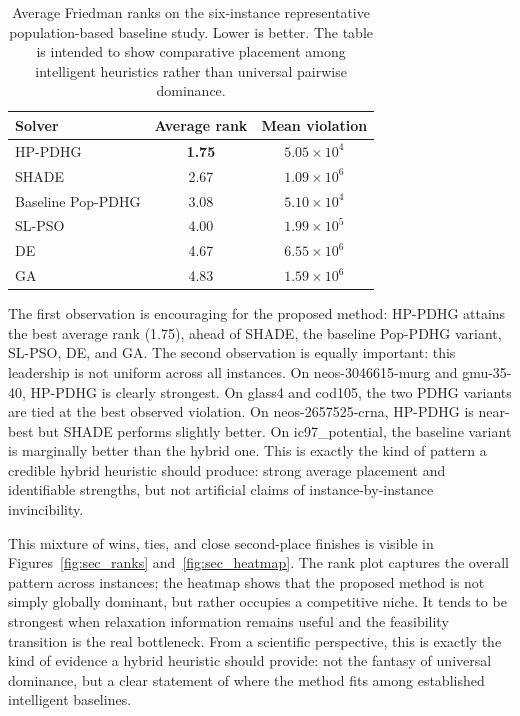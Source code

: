 \begin{table}[htbp]
\centering
\caption{Average Friedman ranks on the six-instance representative population-based baseline study. Lower is better. The table is intended to show comparative placement among intelligent heuristics rather than universal pairwise dominance.}
\label{tab:sec_rank_table}
\small
\begin{tabular}{lcc}
\toprule
\textbf{Solver} & \textbf{Average rank} & \textbf{Mean violation} \\
\midrule
HP-PDHG & \textbf{1.75} & $5.05\times10^{4}$ \\
SHADE & 2.67 & $1.09\times10^{6}$ \\
Baseline Pop-PDHG & 3.08 & $5.10\times10^{4}$ \\
SL-PSO & 4.00 & $1.99\times10^{5}$ \\
DE & 4.67 & $6.55\times10^{6}$ \\
GA & 4.83 & $1.59\times10^{6}$ \\
\bottomrule
\end{tabular}
\end{table}

The first observation is encouraging for the proposed method: HP-PDHG attains the best average rank (1.75), ahead of SHADE, the baseline Pop-PDHG variant, SL-PSO, DE, and GA. The second observation is equally important: this leadership is not uniform across all instances. On neos-3046615-murg and gmu-35-40, HP-PDHG is clearly strongest. On glass4 and cod105, the two PDHG variants are tied at the best observed violation. On neos-2657525-crna, HP-PDHG is near-best but SHADE performs slightly better. On ic97\_potential, the baseline variant is marginally better than the hybrid one. This is exactly the kind of pattern a credible hybrid heuristic should produce: strong average placement and identifiable strengths, but not artificial claims of instance-by-instance invincibility.

This mixture of wins, ties, and close second-place finishes is visible in Figures~\ref{fig:sec_ranks} and~\ref{fig:sec_heatmap}. The rank plot captures the overall pattern across instances; the heatmap shows that the proposed method is not simply globally dominant, but rather occupies a competitive niche. It tends to be strongest when relaxation information remains useful and the feasibility transition is the real bottleneck. From a scientific perspective, this is exactly the kind of evidence a hybrid heuristic should provide: not the fantasy of universal dominance, but a clear statement of where the method fits among established intelligent baselines.

